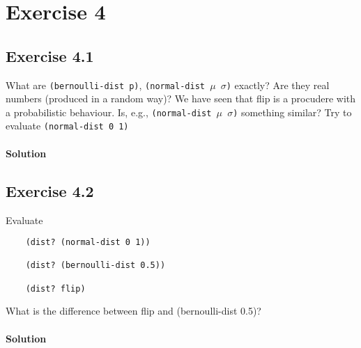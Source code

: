 \section*{Exercise 4}

\subsection*{Exercise 4.1}
What are \texttt{(bernoulli-dist p)}, \texttt{(normal-dist $\mu$ $\sigma$)} exactly? Are they real numbers 
(produced in a random way)?
We have seen that flip is a procudere with a probabilistic behaviour. 
Is, e.g., \texttt{(normal-dist $\mu$ $\sigma$)} something similar?
Try to evaluate \texttt{(normal-dist 0 1)}

\paragraph{Solution}


\subsection*{Exercise 4.2}
Evaluate
\begin{lstlisting}
    (dist? (normal-dist 0 1))
    
    (dist? (bernoulli-dist 0.5))

    (dist? flip)
\end{lstlisting}
What is the difference between flip and (bernoulli-dist 0.5)?

\paragraph{Solution}